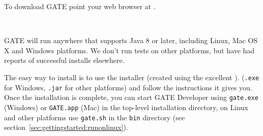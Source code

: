 



To download GATE point your web browser at
.



\mbox{ }

GATE will run anywhere that supports Java 8 or later, including Linux,
Mac OS X and Windows platforms. We don't run tests on other platforms, but have
had reports of successful installs elsewhere.


The easy way to install is to use the installer
(created using the excellent ).
 (\verb!.exe! for
Windows, \verb!.jar! for other platforms) and follow the instructions it gives
you. Once the installation is complete, you can start GATE Developer using
\verb|gate.exe| (Windows) or \verb|GATE.app| (Mac) in the top-level
installation directory, on Linux and other platforms use \verb|gate.sh| 
in the \texttt{bin} directory (see section~\ref{sec:gettingstarted:runonlinux}).



